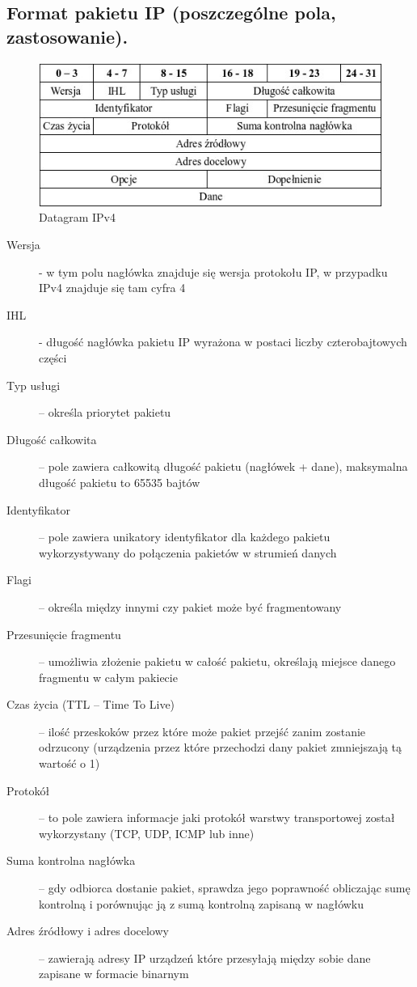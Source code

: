 \documentclass[a4paper,12pt,oneside]{book}
\begin{document}
			\newpage\subsection{Format pakietu IP (poszczególne pola, zastosowanie).}
				\begin{figure}[h!]
					\centering\includegraphics[scale=0.65]{ip-datagram.jpg}
					\caption{Datagram IPv4}
				\end{figure}
				\begin{description}
					\item[Wersja] - w tym polu nagłówka znajduje się wersja protokołu IP, w przypadku IPv4 znajduje się tam cyfra 4
					\item[IHL] - długość nagłówka pakietu IP wyrażona w postaci liczby czterobajtowych części
					\item[Typ usługi] – określa priorytet pakietu
					\item[Długość całkowita] – pole zawiera całkowitą długość pakietu (nagłówek + dane), maksymalna długość pakietu to 65535 bajtów
					\item[Identyfikator ]  – pole zawiera unikatory identyfikator dla każdego pakietu wykorzystywany do połączenia pakietów w strumień danych
					\item[Flagi] – określa między innymi czy pakiet może być fragmentowany
					\item[Przesunięcie fragmentu] – umożliwia złożenie pakietu w całość pakietu, określają miejsce danego fragmentu w całym pakiecie
					\item[Czas życia (TTL – Time To Live)] – ilość przeskoków przez które może pakiet przejść zanim zostanie odrzucony (urządzenia przez które przechodzi dany pakiet zmniejszają tą wartość o 1)
					\item[Protokół ] – to pole zawiera informacje jaki protokół warstwy transportowej został wykorzystany (TCP, UDP, ICMP lub inne)
					\item[Suma kontrolna nagłówka] – gdy odbiorca dostanie pakiet, sprawdza jego poprawność obliczając sumę kontrolną i porównując ją z sumą kontrolną zapisaną w nagłówku
					\item[Adres źródłowy i adres docelowy ] – zawierają adresy IP urządzeń które przesyłają między sobie dane zapisane w formacie binarnym
				\end{description}
\end{document}
